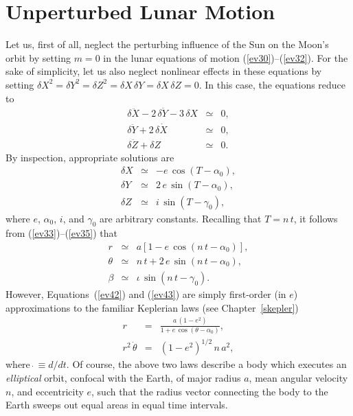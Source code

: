  \section{Unperturbed Lunar Motion}
 Let us, first of all,  neglect the perturbing influence of the Sun on the Moon's orbit by setting $m =0$ in the lunar equations of motion (\ref{ev30})--(\ref{ev32}). For the sake of simplicity, let us also neglect nonlinear effects in these equations by setting $\delta X^2=\delta Y^2=\delta Z^2=\delta X\,\delta Y=\delta X\,\delta Z=0$. In this case, the equations reduce to
  \begin{eqnarray}\label{ev36}
 \delta \ddot{X}-2\,\delta \dot{Y} - 3\,\delta X &\simeq& 0,\\[0.5ex]
 \delta \ddot{Y}+2\,\delta \dot{X} &\simeq& 0,\\[0.5ex]
 \delta\ddot{Z} + \delta Z &\simeq &0.\label{ev38}
 \end{eqnarray}
 By inspection, appropriate solutions are
 \begin{eqnarray}
 \delta X &\simeq &-e\,\cos(T-\alpha_0),\label{ev42x}\\[0.5ex]
 \delta Y &\simeq &2\,e\,\sin(T-\alpha_0),\\[0.5ex]
 \delta Z &\simeq &i\,\sin(T-\gamma_0),\label{ev44x}
 \end{eqnarray}
 where $e$, $\alpha_0$, $i$, and $\gamma_0$ are arbitrary constants. Recalling that $T=n\,t$, it follows from (\ref{ev33})--(\ref{ev35})
  that
 \begin{eqnarray}\label{ev42}
 r &\simeq&a\left[1-e\,\cos(n\,t-\alpha_0)\right],\\[0.5ex]
 \theta &\simeq& n\,t+2\,e\,\sin(n\,t-\alpha_0),\label{ev43}\\[0.5ex]
 \beta &\simeq & \iota\,\sin(n\,t-\gamma_0).\label{ev44}
 \end{eqnarray}
 However,  Equations~(\ref{ev42}) and (\ref{ev43}) are simply first-order (in $e$) approximations to the
 familiar Keplerian laws (see Chapter~\ref{skepler})
 \begin{eqnarray}
 r &=&\frac{a\,(1-e^2)}{1+e\,\cos(\theta-\alpha_0)},\\[0.5ex]
 r^2\,\dot{\theta} &=& (1-e^2)^{1/2}\,n\,a^2,
 \end{eqnarray}
 where $\dot{~}\equiv d/dt$. 
 Of course,  the above two laws describe a  body
 which executes an {\em elliptical}\/ orbit, confocal with the Earth, of major radius $a$, mean angular velocity $n$, and eccentricity
 $e$, such that the radius vector connecting the body to the Earth sweeps out equal areas in equal time intervals.
